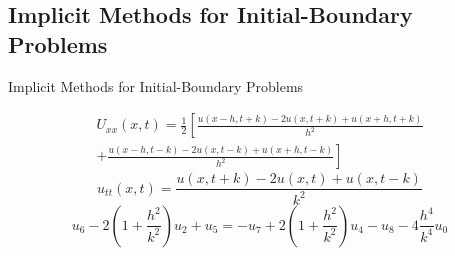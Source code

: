 \subsection{Implicit Methods for Initial-Boundary Problems}

\begin{frame}{Implicit Methods for Initial-Boundary Problems}

\end{frame}


\begin{frame}
\begin{multline}U_{xx}(x,t) = \frac{1}{2} \left [ \frac{u(x-h,t+k) -2u(x,t+k)+u(x+h,t+k)}{h^2} \right. \\
 \left.+ \frac{u(x-h,t-k)-2u(x,t-k)+u(x+h,t-k)}{h^2}\right ]\end{multline}
\vspace{2mm}
\begin{equation}u_{tt}(x,t) =  \frac{u(x,t+k)-2u(x,t)+u(x,t-k)}{k^2} \end{equation}
\vspace{2mm}
\begin{equation}u_6 -2 \left (1 + \frac{h^2}{k^2} \right )u_2 + u_5 = -u_7 +2\left (1 + \frac{h^2}{k^2}\right ) u_4 - u_8 - 4 \frac{h^4}{k^4}u_0\end{equation}
\vspace{2mm}
\end{frame}


